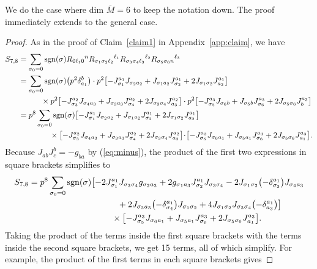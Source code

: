 \documentclass[10pt,a4paper]{amsart}
\numberwithin{equation}{section}
\theoremstyle{definition}
\newcommand{\sgn}{{\rm sgn}}
\newcommand{\om}{\overline{M}}
\newcommand{\barcurvature}[2]{R_{#1}{}^{#2}}
\newcommand{\ssuzero}{\sum_{\sigma_0 = 0} \sgn(\sigma)}
\begin{document}
We do the case where dim $\om = 6$ to keep the notation down. The proof immediately extends to the general case.

\begin{proof}As in the proof of Claim~\ref{claim1} in Appendix~\ref{app:claim}, we have
\begin{align}\label{S78}
S_{7,8} &=\ssuzero\barcurvature{0\ell_1 0}{n}\barcurvature{\sigma_1 \sigma_2\ell_2}{\ell_1}
\barcurvature{\sigma_3\sigma_4\ell_3}{\ell_2}\barcurvature{\sigma_5\sigma_6 n}{\ell_3}\\
&= \ssuzero \bigl(p^2\delta_{a_1}^b\bigr)\cdot p^2\bigl[-J_{\sigma_1}^{a_1}J_{\sigma_2a_2} + J_{\sigma_1a_2}J_{\sigma_2}^{a_1}
+2J_{\sigma_1\sigma_2}J_{a_2}^{a_1}\bigr]\nonumber\\
&\hphantom{=\sum_{\sigma_0 = 0}}{}\times p^2\bigl[-J_{\sigma_3}^{a_2}J_{\sigma_4a_3} + J_{\sigma_3a_3}J_{\sigma_4}^{a_2}
+2J_{\sigma_3\sigma_4}J_{a_3}^{a_2}\bigr]
 \cdot p^2\bigl[-J_{\sigma_5}^{a_3}J_{\sigma_6b} + J_{\sigma_5 b}J_{\sigma_6}^{a_3}
+2J_{\sigma_5\sigma_6}J_{b}^{a_3}\bigr]\nonumber\\
&= p^8\ssuzero\bigl[-J_{\sigma_1}^{a_1}J_{\sigma_2a_2} + J_{\sigma_1a_2}J_{\sigma_2}^{a_1}
+2J_{\sigma_1\sigma_2}J_{a_2}^{a_1}\bigr]\nonumber\\
&\hphantom{= p^8\sum_{\sigma_0 = 0}} \times
\bigl[-J_{\sigma_3}^{a_2}J_{\sigma_4a_3} + J_{\sigma_3a_3}J_{\sigma_4}^{a_2}
+2J_{\sigma_3\sigma_4}J_{a_3}^{a_2}\bigr]
 \!\cdot \!\bigl[-J_{\sigma_5}^{a_3}J_{\sigma_6a_1} + J_{\sigma_5 a_1}J_{\sigma_6}^{a_3}
+2J_{\sigma_5\sigma_6}J_{a_1}^{a_3}\bigr]. \nonumber
\end{align}
Because $J_{ab}J^b_c
= -g_{ba}$ by (\ref{eq:minus}),
the product of the first
two expressions in square brackets simplifies to
\begin{gather*}
S_{7,8} = p^8\ssuzero\bigl[-2J_{\sigma_1}^{a_1}J_{\sigma_3\sigma_4}g_{\sigma_2a_3}
+2g_{\sigma_1a_3}J_{\sigma_2}^{a_1}J_{\sigma_3\sigma_4}
-2J_{\sigma_1\sigma_2}\bigl(-\delta_{\sigma_3}^{a_1}\bigr)J_{\sigma_4a_3}\\
\hphantom{S_{7,8} = p^8\ssuzero\bigl[}{}
+2J_{\sigma_3a_3}\bigl(-\delta_{\sigma_4}^{a_1}\bigr)J_{\sigma_1\sigma_2}
+4J_{\sigma_1\sigma_2}J_{\sigma_3\sigma_4}\bigl(-\delta_{a_3}^{a_1}\bigr)\bigr]\\
\hphantom{S_{7,8} = p^8\sum_{\sigma_0 = 0}\bigl[}{}
 \times \bigl[-J_{\sigma_5}^{a_3}J_{\sigma_6a_1} + J_{\sigma_5 a_1}J_{\sigma_6}^{a_3}
+2J_{\sigma_5\sigma_6}J_{a_1}^{a_3}\bigr].
\end{gather*}
Taking the product of the terms inside the first square brackets with the terms inside the second square brackets, we get 15 terms, all of which simplify. For example, the product of the first terms in each square brackets gives

\end{proof}
\end{document}
